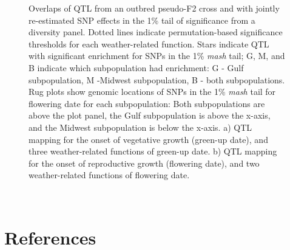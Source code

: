\documentclass[
  9pt,
  twocolumn,
  twoside]{simple-article}%
\begin{document}
\begin{figure}


\caption{\label{fig-qtl}Overlaps of QTL from an outbred pseudo-F2 cross
and with jointly re-estimated SNP effects in the 1\% tail of
significance from a diversity panel. Dotted lines indicate
permutation-based significance thresholds for each weather-related
function. Stars indicate QTL with significant enrichment for SNPs in the
1\% \emph{mash} tail; G, M, and B indicate which subpopulation had
enrichment: G - Gulf subpopulation, M -Midwest subpopulation, B - both
subpopulations. Rug plots show genomic locations of SNPs in the 1\%
\emph{mash} tail for flowering date for each subpopulation: Both
subpopulations are above the plot panel, the Gulf subpopulation is above
the x-axis, and the Midwest subpopulation is below the x-axis. a) QTL
mapping for the onset of vegetative growth (green-up date), and three
weather-related functions of green-up date. b) QTL mapping for the onset
of reproductive growth (flowering date), and two weather-related
functions of flowering date.}

\end{figure}%

\hfill\break
~

\section{References}\label{references}

\renewcommand{\bibsection}{}

\end{document}
